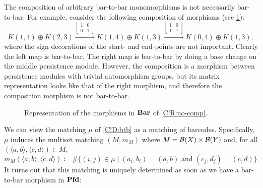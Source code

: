\begin{remark}
\label{C!R:no-comp}
  The composition of arbitrary bar-to-bar monomorphisms is not necessarily bar-to-bar. For example, consider the following composition of morphisms (see \cref{C!F:no-comp}):
  \[
    K(1, 4) \oplus K(2, 3) \xrightarrow{\begin{bmatrix} 1 & 0 \\ 0 & 1 \end{bmatrix}} K(1, 4) \oplus K(1, 3)
    \xrightarrow{\begin{bmatrix} 1 & 0 \\ 1 & 1 \end{bmatrix}} K(0, 4) \oplus K(1, 3),
  \]
  where the sign decorations of the start- and end-points are not important.
  Clearly the left map is bar-to-bar. The right map is bar-to-bar by doing a base change on the middle persistence module. However, the composition is a morphism between persistence modules with trivial automorphism groups, but its matrix representation looks like that of the right morphism, and therefore the composition morphism is not bar-to-bar.
\end{remark}

\begin{figure}[tbp]
  \centering
  \caption{Representation of the morphisms in $\Bar$ of \cref{C!R:no-comp}.}
  \label{C!F:no-comp}
\end{figure}

We can view the matching $\mu$ of \cref{C!D:btb} as a matching of barcodes. Specifically, $\mu$ induces the multiset matching $(M, m_M)$ where $M = \cc{B}(X) \times \cc{B}(Y)$ and, for all $(\langle a, b \rangle, \langle c, d \rangle) \in M$,
\[
  m_M(\langle a, b \rangle, \langle c, d \rangle) \coloneq \#\{(i, j) \in \mu \mid (a_i, b_i) = (a, b) \text{ and } (c_j, d_j) = (c, d)\}.
\]
It turns out that this matching is uniquely determined as soon as we have a bar-to-bar morphism in $\Pfd$:

